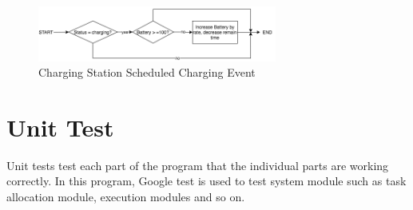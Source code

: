 \begin{figure}[htbp]
    \centering
    \includegraphics[width = 0.7\textwidth]{content/images/ch4/charging_station_charging_event.drawio.png}
    \caption{Charging Station Scheduled Charging Event}
    \label{fig:charging_station_event}
\end{figure}

\section{Unit Test}
Unit tests test each part of the program that the individual parts are working correctly. In this program, Google test is used to test system module such as task allocation module, execution modules and so on. 


